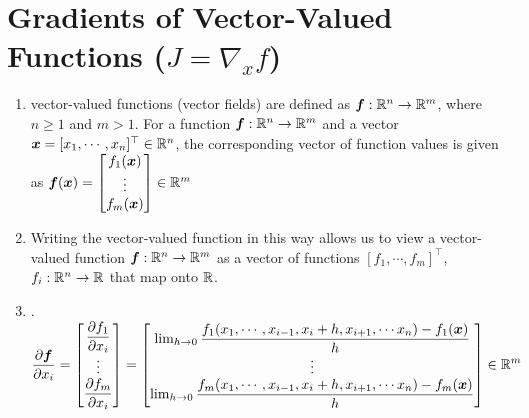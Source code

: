 \section{Gradients of Vector-Valued Functions ($J = \nabla_x f$)}

\begin{enumerate}
    \item
    \begin{definition}
        vector-valued functions (vector fields) are defined as $\bm{f} : \mathbb{R}^n \to \mathbb{R}^m$, where $n \geq 1$ and $m > 1$.
        For a function $\bm{f} : \mathbb{R}^n \to \mathbb{R}^m$ and a vector $\bm{x} = [x_1, \cdots , x_n]^\top \in \mathbb{R}^n$, the corresponding vector of function values is given as
        $
            \bm{f}(\bm{x})
            = \begin{bmatrix}
                f_1(\bm{x}) \\
                \vdots \\
                f_m(\bm{x})
            \end{bmatrix}
            \in \mathbb{R}^m
        $
        \hfill \cite{mfml/book/mml/Deisenroth-Faisal-Ong}
    \end{definition}

    \item Writing the vector-valued function in this way allows us to view a vector-valued function $\bm{f} : \mathbb{R}^n \to \mathbb{R}^m$ as a vector of functions $[f_1, \cdots , f_m]^\top$, $f_i : \mathbb{R}^n \to \mathbb{R}$ that map onto $\mathbb{R}$.
    \hfill \cite{mfml/book/mml/Deisenroth-Faisal-Ong}

    \item
    .\hfill
    ${
        \displaystyle
        \dfrac{\partial\bm{f}}{\partial x_i}
        = \begin{bmatrix}
            \dfrac{\partial f_1}{\partial x_i} \\
            \vdots \\
            \dfrac{\partial f_m}{\partial x_i}
        \end{bmatrix}
        = \begin{bmatrix}
            \lim_{h \to 0} \dfrac{f_1(x_1,\cdots,x_{i-1},x_i+h,x_{i+1},\cdots x_n)-f_1(\bm{x})}{h} \\
            \vdots \\
            \lim_{h \to 0} \dfrac{f_m(x_1,\cdots,x_{i-1},x_i+h,x_{i+1},\cdots x_n)-f_m(\bm{x})}{h}
        \end{bmatrix}
        \in \mathbb{R}^m
    }$
    \hfill \cite{mfml/book/mml/Deisenroth-Faisal-Ong}


\end{enumerate}

